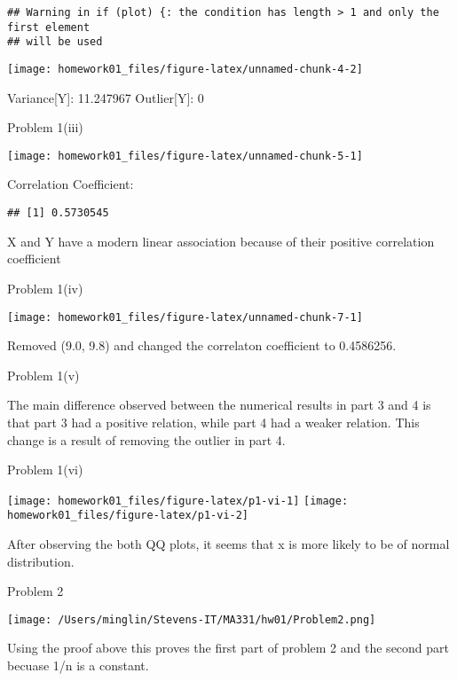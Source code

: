 \documentclass[
]{article}
\begin{document}
\begin{verbatim}
## Warning in if (plot) {: the condition has length > 1 and only the first element
## will be used
\end{verbatim}

\begin{center}\texttt{[image: homework01\_files/figure-latex/unnamed-chunk-4-2]} \end{center}

Variance{[}Y{]}: 11.247967 Outlier{[}Y{]}: 0

Problem 1(iii)

\begin{center}\texttt{[image: homework01\_files/figure-latex/unnamed-chunk-5-1]} \end{center}

Correlation Coefficient:

\begin{verbatim}
## [1] 0.5730545
\end{verbatim}

X and Y have a modern linear association because of their positive
correlation coefficient

Problem 1(iv)

\begin{center}\texttt{[image: homework01\_files/figure-latex/unnamed-chunk-7-1]} \end{center}

Removed (9.0, 9.8) and changed the correlaton coefficient to 0.4586256.

Problem 1(v)

The main difference observed between the numerical results in part 3 and
4 is that part 3 had a positive relation, while part 4 had a weaker
relation. This change is a result of removing the outlier in part 4.

Problem 1(vi)

\texttt{[image: homework01\_files/figure-latex/p1-vi-1]}
\texttt{[image: homework01\_files/figure-latex/p1-vi-2]}

After observing the both QQ plots, it seems that x is more likely to be
of normal distribution.

Problem 2

\texttt{[image: /Users/minglin/Stevens-IT/MA331/hw01/Problem2.png]}

Using the proof above this proves the first part of problem 2 and the
second part becuase 1/n is a constant.
\end{document}
